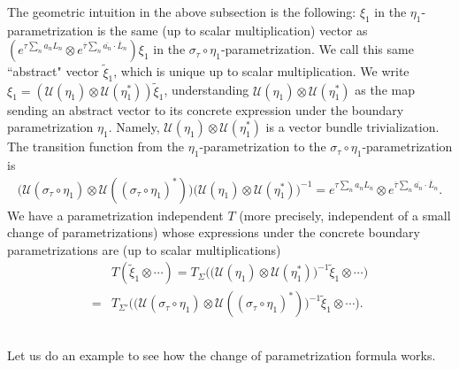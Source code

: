 \documentclass[11pt,b5paper,notitlepage]{article}
\theoremstyle{definition}
\theoremstyle{plain}
\newcommand{\mc}{\mathcal}
\newcommand{\wtd}{\widetilde}
\newcommand{\ovl}{\overline}
\numberwithin{equation}{section}
\begin{document}
The geometric intuition in the above subsection is the following: $\xi_1$ in the $\eta_1$-parametrization is the same (up to scalar multiplication) vector as $(e^{\tau\sum_n a_nL_n}\otimes e^{\ovl \tau\sum_n \ovl {a_n}\cdot\ovl L_n})\xi_1$ in the $\sigma_\tau\circ\eta_1$-parametrization.  We call this same ``abstract" vector $\wtd\xi_1$, which is unique up to scalar multiplication. We write $\xi_1=(\mc U(\eta_1)\otimes\mc U(\eta_1^*))\wtd \xi_1$, understanding $\mc U(\eta_1)\otimes\mc U(\eta_1^*)$ as the map sending an abstract vector to its concrete expression under the boundary parametrization $\eta_1$. Namely, $\mc U(\eta_1)\otimes\mc U(\eta_1^*)$ is a vector bundle trivialization.  The transition function from the $\eta_1$-parametrization to the $\sigma_\tau\circ\eta_1$-parametrization is
\begin{align}
\big(\mc U(\sigma_\tau\circ\eta_1)\otimes\mc U((\sigma_\tau\circ\eta_1)^*)\big)\big(\mc U(\eta_1)\otimes\mc U(\eta_1^*)\big)^{-1}=e^{\tau\sum_n a_nL_n}\otimes e^{\ovl \tau\sum_n \ovl {a_n}\cdot\ovl L_n}.	
\end{align}
We have a parametrization independent $T$ (more precisely, independent of a small change of parametrizations)  whose expressions under the concrete boundary parametrizations are (up to scalar multiplications)
\begin{align*}
&T(\wtd\xi_1\otimes\cdots)=T_\Sigma\Big(\big(\mc U(\eta_1)\otimes\mc U(\eta_1^*)\big)^{-1}\wtd\xi_1\otimes\cdots\Big)\\
=&T_{\Sigma'}\Big(\big(\mc U(\sigma_\tau\circ\eta_1)\otimes\mc U((\sigma_\tau\circ\eta_1)^*)\big)^{-1}\wtd\xi_1\otimes\cdots\Big).
\end{align*}







\subsection{}

Let us do an example to see how the change of parametrization formula works. 
\end{document}
